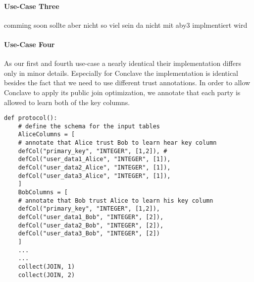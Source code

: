 \paragraph{Use-Case Three}
comming soon sollte aber nicht so viel sein da nicht mit aby3 implmentiert wird

\paragraph{Use-Case Four}
As our first and fourth use-case a nearly identical their implementation differs only in minor details. Especially for Conclave the implementation is identical besides the fact that we need to use different trust annotations. In order to allow Conclave to apply its public join optimization, we annotate that each party is allowed to learn both of the key columns.

\begin{lstlisting}[caption={ The Python protocol of Conclave for our last use-case    }]
	def protocol():
	# define the schema for the input tables 
	AliceColumns = [
	# annotate that Alice trust Bob to learn hear key column
	defCol("primary_key", "INTEGER", [1,2]), #
	defCol("user_data1_Alice", "INTEGER", [1]),
	defCol("user_data2_Alice", "INTEGER", [1]),
	defCol("user_data3_Alice", "INTEGER", [1]),
	]
	BobColumns = [
	# annotate that Bob trust Alice to learn his key column
	defCol("primary_key", "INTEGER", [1,2]),
	defCol("user_data1_Bob", "INTEGER", [2]),
	defCol("user_data2_Bob", "INTEGER", [2]),
	defCol("user_data3_Bob", "INTEGER", [2])
	]
	...
	...
	collect(JOIN, 1)
	collect(JOIN, 2)
\end{lstlisting}




